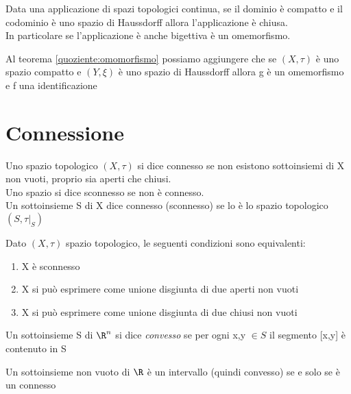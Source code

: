 \documentclass[a4paper]{article}
\begin{document}
\begin{prop}

	Data una applicazione di spazi topologici continua, se il dominio è compatto e il codominio è uno spazio di Haussdorff allora l'applicazione è chiusa. \\
	In particolare se l'applicazione è anche bigettiva è un omemorfismo.
\end{prop}

\begin{cor}
	Al teorema \ref{quoziente:omomorfismo} possiamo aggiungere che se $(X,\tau)$ è uno spazio compatto e $(Y,\xi)$ è uno spazio di Haussdorff allora g è un omemorfismo e f una identificazione
\end{cor}

\section{Connessione}

\begin{deff}
	Uno spazio topologico $(X,\tau )$ si dice connesso se non esistono sottoinsiemi di X non vuoti, proprio sia aperti che chiusi. \\
	Uno spazio si dice sconnesso se non è connesso.\\
	Un sottoinsieme S di X dice connesso (sconnesso) se lo è lo spazio topologico $(S, \tau |_S )$
	
\end{deff}

\begin{prop}
	Dato $(X, \tau)$ spazio topologico, le seguenti condizioni sono equivalenti:
	\begin{enumerate}
		\item X è sconnesso
		\item X si può esprimere come unione disgiunta di due aperti non vuoti
		\item X si può esprimere come unione disgiunta di due chiusi non vuoti
	\end{enumerate}
\end{prop}

\begin{deff}
	Un sottoinsieme S di $\R ^n$ si dice \textit{convesso} se per ogni x,y $\in S $ il segmento [x,y] è contenuto in S
\end{deff}

\begin{teo}
	Un sottoinsieme non vuoto di $\R$ è un intervallo (quindi convesso) se e solo se è un connesso
\end{teo}
\end{document}
